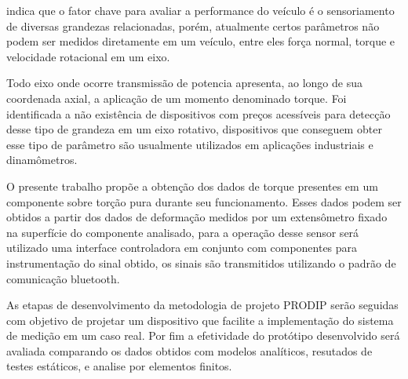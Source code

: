 
\cite{Nurprasetio} %
indica que o fator chave para avaliar a performance do veículo é o sensoriamento de diversas grandezas relacionadas, porém, atualmente certos parâmetros não podem ser medidos diretamente em um veículo, entre eles força normal, torque e velocidade rotacional em um eixo.

Todo eixo onde ocorre transmissão de potencia apresenta, ao longo de sua coordenada axial, a aplicação de um momento denominado torque. Foi identificada a não existência de dispositivos com preços acessíveis para detecção desse tipo de grandeza em um eixo rotativo, dispositivos que conseguem obter esse tipo de parâmetro são usualmente utilizados em aplicações industriais e dinamômetros.

O presente trabalho propõe a obtenção dos dados de torque presentes em um componente sobre torção pura durante seu funcionamento. Esses dados podem ser obtidos a partir dos dados de deformação medidos por um extensômetro fixado na superfície do componente analisado, para a operação desse sensor será utilizado uma interface controladora em conjunto com componentes para instrumentação do sinal obtido, os sinais são transmitidos utilizando o padrão de comunicação bluetooth.

As etapas de desenvolvimento da metodologia de projeto PRODIP serão seguidas com objetivo de projetar um dispositivo que facilite a implementação do sistema de medição em um caso real. Por fim a efetividade do protótipo desenvolvido será avaliada comparando os dados obtidos com modelos analíticos, resutados de testes estáticos, e analise por elementos finitos.

